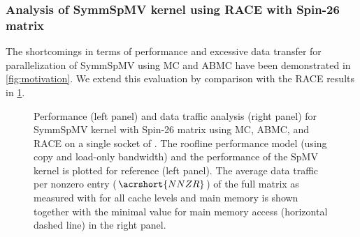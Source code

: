 \subsubsection{Analysis of \acrshort{SymmSpMV} kernel using RACE with Spin-26 matrix}
\label{Sec:Spin26full}
%
The shortcomings in terms of performance and excessive data transfer for parallelization of \acrshort{SymmSpMV} using MC and ABMC have been demonstrated in \cref{fig:motivation}. We extend this evaluation by comparison with the \acrshort{RACE} results in \cref{fig:motivation_w_RACE}.
 \begin{figure}[tbp]
 	\centering
 	\hspace{1em}
 	\caption{Performance (left panel) and data traffic analysis (right panel) for \acrshort{SymmSpMV} kernel with Spin-26 matrix using \acrshort{MC}, \acrshort{ABMC}, and \acrshort{RACE} on a single socket of \IVB. The roofline performance model (using copy and load-only bandwidth) and the performance of the \acrshort{SpMV} kernel is plotted for reference (left panel). The average data traffic per nonzero entry ($\acrshort{NNZR}$) of the full matrix as measured with \LIKWID for all cache levels and main memory is shown together with the minimal value for main memory access (horizontal dashed line) in the right panel.}
 	\label{fig:motivation_w_RACE}
 \end{figure}
